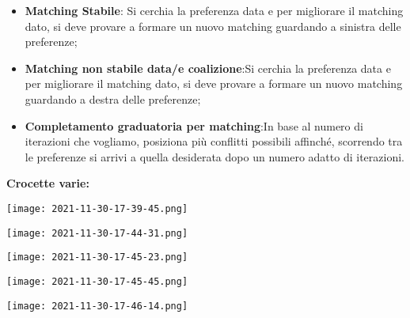 \documentclass{article}
\theoremstyle{definition}
\theoremstyle{remark}
\begin{document}
\begin{itemize}
    \item \textbf{Matching Stabile}: Si cerchia la preferenza data e per migliorare il matching dato, si deve provare a formare un nuovo matching guardando a sinistra delle preferenze;
    \item \textbf{Matching non stabile data/e coalizione}:Si cerchia la preferenza data e per migliorare il matching dato, si deve provare a formare un nuovo matching guardando a destra delle preferenze;
    \item \textbf{Completamento graduatoria per matching}:In base al numero di iterazioni che vogliamo, posiziona più conflitti possibili affinché, scorrendo tra le preferenze si arrivi a quella desiderata
    dopo un numero adatto di iterazioni.
\end{itemize}
\newpage
\textbf{Crocette varie:}
\begin{center}
    \texttt{[image: 2021-11-30-17-39-45.png]}
\end{center}
\begin{center}
    \texttt{[image: 2021-11-30-17-44-31.png]}
\end{center}
\begin{center}
    \texttt{[image: 2021-11-30-17-45-23.png]}
\end{center}
\begin{center}
    \texttt{[image: 2021-11-30-17-45-45.png]}
\end{center}
\begin{center}
    \texttt{[image: 2021-11-30-17-46-14.png]}
\end{center}
\end{document}
